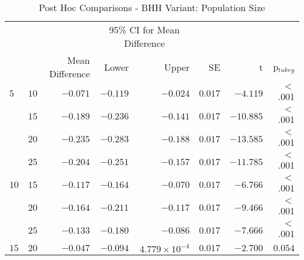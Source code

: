 \begin{table}[htb]
	\centering
	\caption{Post Hoc Comparisons - BHH Variant: Population Size}
	\label{tab:results:population:post_hoc}%
	\par\bigskip
	\resizebox{\textwidth}{!}
	{
		\begin{tabular}{lrrrrrrr}
			\toprule
			\multicolumn{1}{c}{} & \multicolumn{1}{c}{} & \multicolumn{1}{c}{} & \multicolumn{2}{c}{95\% CI for Mean Difference} & \multicolumn{1}{c}{} & \multicolumn{1}{c}{} & \multicolumn{1}{c}{}               \\
			\cline{4-5}
			$ $                  & $ $                  & Mean Difference      & Lower                                           & Upper                & SE                   & t                    & p$_{tukey}$ \\
			\cmidrule[0.4pt]{1-8}
			$5$                  & $10$                 & $-0.071$             & $-0.119$                                        & $-0.024$             & $0.017$              & $-4.119$             & $<$ .001    \\
			$ $                  & $15$                 & $-0.189$             & $-0.236$                                        & $-0.141$             & $0.017$              & $-10.885$            & $<$ .001    \\
			                     & $20$                 & $-0.235$             & $-0.283$                                        & $-0.188$             & $0.017$              & $-13.585$            & $<$ .001    \\
			                     & $25$                 & $-0.204$             & $-0.251$                                        & $-0.157$             & $0.017$              & $-11.785$            & $<$ .001    \\
			$10$                 & $15$                 & $-0.117$             & $-0.164$                                        & $-0.070$             & $0.017$              & $-6.766$             & $<$ .001    \\
			$ $                  & $20$                 & $-0.164$             & $-0.211$                                        & $-0.117$             & $0.017$              & $-9.466$             & $<$ .001    \\
			                     & $25$                 & $-0.133$             & $-0.180$                                        & $-0.086$             & $0.017$              & $-7.666$             & $<$ .001    \\
			$15$                 & $20$                 & $-0.047$             & $-0.094$                                        & $4.779\times10^{-4}$ & $0.017$              & $-2.700$             & $0.054$     \\

\end{tabular}}
\end{table}
